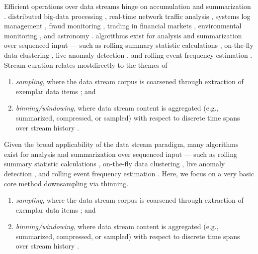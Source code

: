 Efficient operations over data streams hinge on accumulation and summarization .
distributed big-data processing \citep{he2010comet}, real-time network traffic analysis \citep{johnson2005streams,muthukrishnan2005data}, systems log management \citep{fischer2012real}, fraud monitoring \citep{rajeshwari2016real}, trading in financial markets \citep{agarwal2009faster}, environmental monitoring \citep{hill2009real}, and astronomy \citep{graham2012data}.
algorithms exist for analysis and summarization over sequenced input --- such as rolling summary statistic calculations \citep{lin2004continuously}, on-the-fly data clustering \citep{silva2013data}, live anomaly detection \citep{cai2004maids}, and rolling event frequency estimation \citep{manku2002approximate}.
Stream curation relates mostdirectly to the themes of
\begin{enumerate}
\item \textit{sampling}, where the data stream corpus is coarsened through extraction of exemplar data items \citep{sibai2016sampling}; and
\item \textit{binning/windowing}, where data stream content is aggregated (e.g., summarized, compressed, or sampled) with respect to discrete time spans over stream history \citep{gama2007data}.
\end{enumerate}

Given the broad applicability of the data stream paradigm, many algorithms exist for analysis and summarization over sequenced input --- such as rolling summary statistic calculations \citep{lin2004continuously}, on-the-fly data clustering \citep{silva2013data}, live anomaly detection \citep{cai2004maids}, and rolling event frequency estimation \citep{manku2002approximate}.
Here, we focus on a very basic core method downsampling via thinning.
\begin{enumerate}
\item \textit{sampling}, where the data stream corpus is coarsened through extraction of exemplar data items \citep{sibai2016sampling}; and
\item \textit{binning/windowing}, where data stream content is aggregated (e.g., summarized, compressed, or sampled) with respect to discrete time spans over stream history \citep{gama2007data}.
\end{enumerate}

